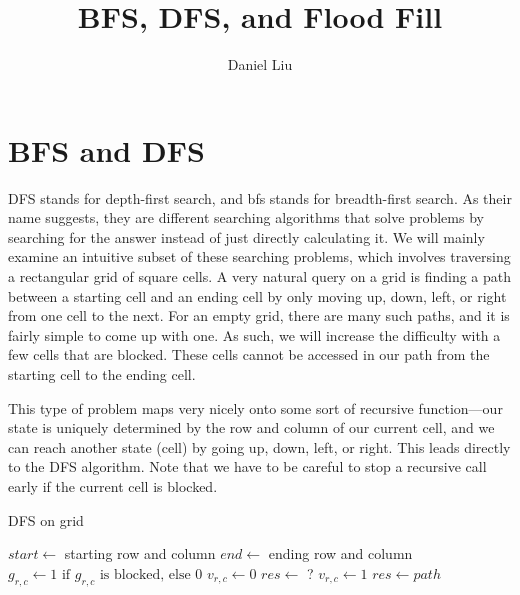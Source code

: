 \documentclass{article}
\title{BFS, DFS, and Flood Fill}
\author{Daniel Liu}
\begin{document}
    \maketitle

    \section{BFS and DFS}
    DFS stands for depth-first search, and bfs stands for breadth-first search. As their name suggests, they are different searching algorithms that solve problems by searching for the answer instead of just directly calculating it. We will mainly examine an intuitive subset of these searching problems, which involves traversing a rectangular grid of square cells. A very natural query on a grid is finding a path between a starting cell and an ending cell by only moving up, down, left, or right from one cell to the next. For an empty grid, there are many such paths, and it is fairly simple to come up with one. As such, we will increase the difficulty with a few cells that are blocked. These cells cannot be accessed in our path from the starting cell to the ending cell.

    This type of problem maps very nicely onto some sort of recursive function---our state is uniquely determined by the row and column of our current cell, and we can reach another state (cell) by going up, down, left, or right. This leads directly to the DFS algorithm. Note that we have to be careful to stop a recursive call early if the current cell is blocked.

    \begin{algorithm}
        \caption{DFS on grid}
        \begin{algorithmic}[1]
            \State $start \gets$ starting row and column
            \State $end \gets$ ending row and column
            \State $g_{r, c} \gets 1 \textrm{ if } g_{r, c} \textrm{ is blocked, else } 0$
            \State $v_{r, c} \gets 0$
            \State $res \gets $ ?
                    \State \Return
                \EndIf
                \State $v_{r, c} \gets 1$
                    \State $res \gets path$
                    \State \Return
                \EndIf
                    \State {}
                \EndFor
            \EndFunction
            \State {}
        \end{algorithmic}
    \end{algorithm}
\end{document}
